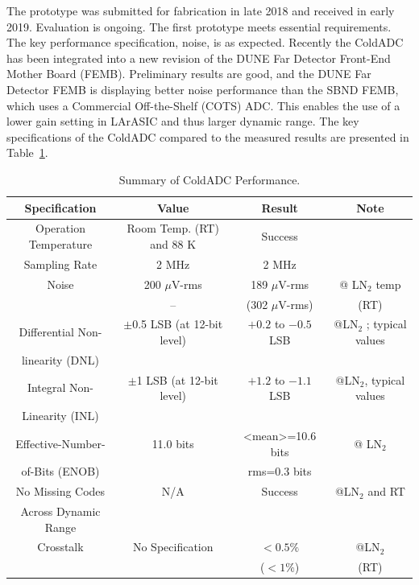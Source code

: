 The prototype was submitted for fabrication in late 2018 and received in early 2019. Evaluation is ongoing. 
The first prototype meets essential requirements. The key performance specification, noise, is as expected. Recently the ColdADC has been integrated into a new revision of the DUNE Far Detector Front-End Mother Board (FEMB). Preliminary results are good, and the DUNE Far Detector FEMB is displaying better noise performance than the SBND FEMB, which uses a Commercial Off-the-Shelf (COTS) ADC. This enables the use of a lower gain setting in LArASIC and thus larger dynamic range. The key specifications of the ColdADC compared to the measured results are presented in Table~\ref{tab:coldadc_specs}.
\begin{table}[h]
\centering
\begin{tabular}{|c|c|c|c|}
\hline
\textbf{ Specification } & \textbf{Value} & \textbf{Result} & \textbf{Note}  \\ \hline \hline
Operation Temperature &  Room Temp. (RT) and 88 K & Success & \\ \hline
Sampling Rate & 2 MHz & 2 MHz & \\ \hline
Noise & 200 $\mu$V-rms & 189 $\mu$V-rms & @ LN$_2$ temp \\ 
      &    --            & (302 $\mu$V-rms) & (RT) \\ \hline
Differential Non- & $\pm$0.5 LSB (at 12-bit level) & $+0.2$ to $-0.5$ LSB & @LN$_2$ ; typical values \\
linearity (DNL) & & &  \\ \hline
Integral Non- & $\pm$1 LSB (at 12-bit level) & $+1.2$ to $-1.1$ LSB & @LN$_2$, typical values \\
Linearity (INL) & & &  \\ \hline
Effective-Number- & 11.0 bits & <mean>=10.6 bits & @ LN$_2$ \\ 
of-Bits (ENOB) & & rms=0.3 bits & \\ \hline
No Missing Codes & N/A & Success & @LN$_2$ and RT \\ 
Across Dynamic Range & & & \\ \hline
Crosstalk  & No Specification & $<0.5\%$ & @LN$_2$ \\ 
           &                  & ($<1\%$) &  (RT) \\ \hline
\end{tabular}
\caption{Summary of ColdADC Performance.}
\label{tab:coldadc_specs}
\end{table}  

